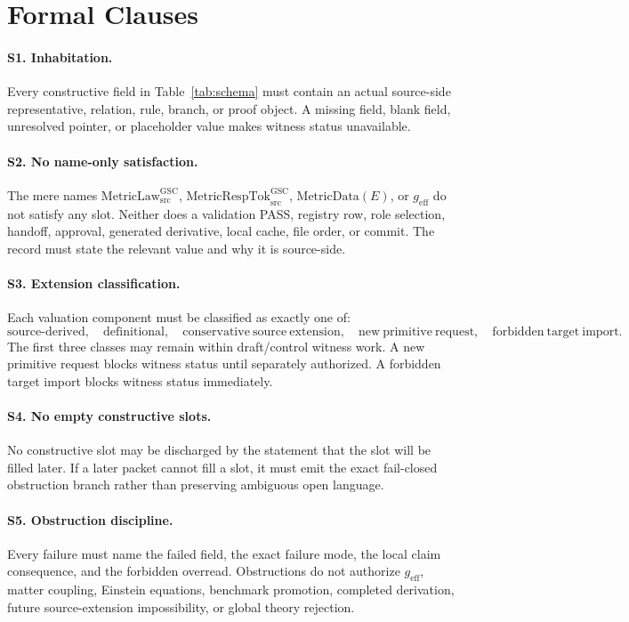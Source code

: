 \documentclass[11pt]{article}
\newcommand{\MetricLaw}{\mathrm{MetricLaw}_{\mathrm{src}}^{\mathrm{GSC}}}
\newcommand{\MetricRespTok}{\mathrm{MetricRespTok}_{\mathrm{src}}^{\mathrm{GSC}}}
\newcommand{\MetricData}{\mathrm{MetricData}}
\newcommand{\geff}{g_{\mathrm{eff}}}
\begin{document}
\section{Formal Clauses}

\paragraph{S1. Inhabitation.}
Every constructive field in Table~\ref{tab:schema} must contain an actual
source-side representative, relation, rule, branch, or proof object. A missing
field, blank field, unresolved pointer, or placeholder value makes witness
status unavailable.

\paragraph{S2. No name-only satisfaction.}
The mere names \(\MetricLaw\), \(\MetricRespTok\), \(\MetricData(E)\), or
\(\geff\) do not satisfy any slot. Neither does a validation PASS, registry row,
role selection, handoff, approval, generated derivative, local cache, file
order, or commit. The record must state the relevant value and why it is
source-side.

\paragraph{S3. Extension classification.}
Each valuation component must be classified as exactly one of:
\[
  \mathrm{source\mbox{-}derived},\quad
  \mathrm{definitional},\quad
  \mathrm{conservative\ source\ extension},\quad
  \mathrm{new\ primitive\ request},\quad
  \mathrm{forbidden\ target\ import}.
\]
The first three classes may remain within draft/control witness work. A new
primitive request blocks witness status until separately authorized. A
forbidden target import blocks witness status immediately.

\paragraph{S4. No empty constructive slots.}
No constructive slot may be discharged by the statement that the slot will be
filled later. If a later packet cannot fill a slot, it must emit the exact
fail-closed obstruction branch rather than preserving ambiguous open language.

\paragraph{S5. Obstruction discipline.}
Every failure must name the failed field, the exact failure mode, the local
claim consequence, and the forbidden overread. Obstructions do not authorize
\(\geff\), matter coupling, Einstein equations, benchmark promotion, completed
derivation, future source-extension impossibility, or global theory rejection.
\end{document}
